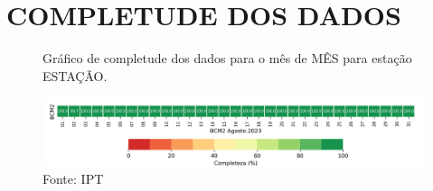 \section{COMPLETUDE DOS DADOS}

\begin{figure}[htb!]
    \centering
	\captionsetup{justification=raggedright, singlelinecheck=false, width=1\textwidth}
    \caption{Gráfico de completude dos dados para o mês de MÊS para estação ESTAÇÃO.}
    \includegraphics[width=1.0\textwidth]{./boletim/main/figuras/completude.png} %
    \caption*{Fonte: IPT}
    \label{fig:completude}
\end{figure}


